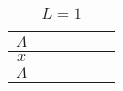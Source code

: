 
\begin{table}
  \centering
  \caption{$L = 1$}
  \begin{tabular}{|c|c|c|c|c|c|}
    \hline
    $\Lambda$ & & & & & \\ \hline
    $x$ & & & & & \\ \hline
    $\Lambda$ & & & & & \\ \hline
  \end{tabular}
\end{table}
